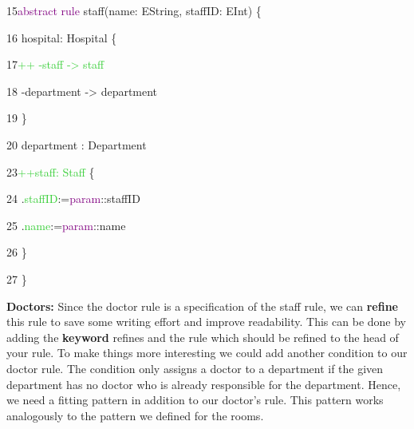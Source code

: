 {

15\hspace{0.5cm}\textcolor{Purple}{abstract rule} staff(name: EString, staffID: EInt) \{ 

16\hspace{1cm}		hospital: Hospital \{

17\hspace{1.5cm}\textcolor{LimeGreen}{++ -staff -> staff} 

18\hspace{1.5cm}			-department -> department

19\hspace{1cm}		\}

20\hspace{1cm}		department : Department

23\hspace{1cm}\textcolor{LimeGreen}{++staff: Staff} \{ 

24\hspace{1.5cm}		.\textcolor{LimeGreen}{staffID}:=\textcolor{Purple}{param}::staffID

25\hspace{1.5cm}			.\textcolor{LimeGreen}{name}:=\textcolor{Purple}{param}::name

26\hspace{1cm}		\}

27\hspace{0.5cm}	\}\newline\newline

}


\textbf{Doctors:}\newline
Since the doctor rule is a specification of the staff rule, we can \textbf{refine} this rule to save some writing effort and improve readability. This can be done by adding the \textbf{keyword} \textsf{refines} and the rule which should be refined to the head of your rule.\newline
To make things more interesting we could add another condition to our doctor rule. The condition only assigns a doctor to a department if the given department has no doctor who is already responsible for the department. Hence, we need a fitting pattern in addition to our doctor’s rule.\newline
This pattern works analogously to the pattern we defined for the rooms.\newline\newline

